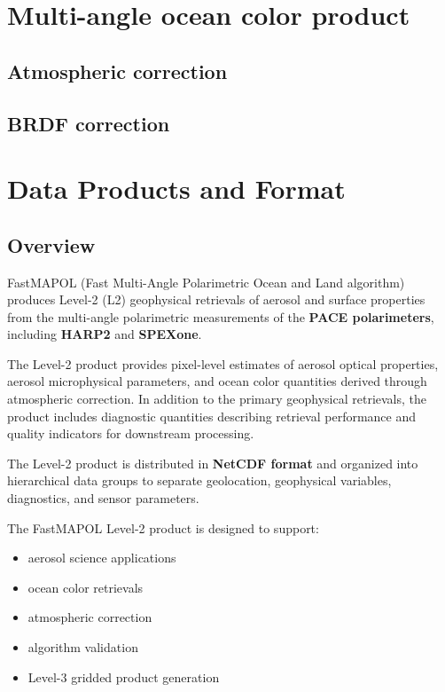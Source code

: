 \documentclass[
  letterpaper,
]{scrbook}
\providecommand{\tightlist}{%
  \setlength{\itemsep}{0pt}\setlength{\parskip}{0pt}}
\begin{document}

\chapter{Multi-angle ocean color
product}\label{multi-angle-ocean-color-product}

\section{Atmospheric correction}\label{atmospheric-correction}

\section{BRDF correction}\label{brdf-correction}


\chapter{Data Products and Format}\label{data-products-and-format}

\section{Overview}\label{overview}

FastMAPOL (Fast Multi-Angle Polarimetric Ocean and Land algorithm)
produces Level-2 (L2) geophysical retrievals of aerosol and surface
properties from the multi-angle polarimetric measurements of the
\textbf{PACE polarimeters}, including \textbf{HARP2} and
\textbf{SPEXone}.

The Level-2 product provides pixel-level estimates of aerosol optical
properties, aerosol microphysical parameters, and ocean color quantities
derived through atmospheric correction. In addition to the primary
geophysical retrievals, the product includes diagnostic quantities
describing retrieval performance and quality indicators for downstream
processing.

The Level-2 product is distributed in \textbf{NetCDF format} and
organized into hierarchical data groups to separate geolocation,
geophysical variables, diagnostics, and sensor parameters.

The FastMAPOL Level-2 product is designed to support:

\begin{itemize}
\tightlist
\item
  aerosol science applications
\item
  ocean color retrievals
\item
  atmospheric correction
\item
  algorithm validation
\item
  Level-3 gridded product generation
\end{itemize}
\end{document}
